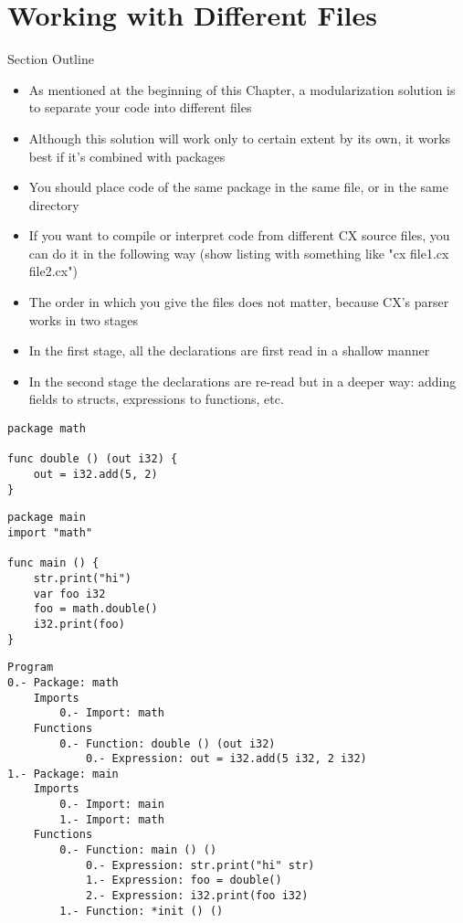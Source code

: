 \documentclass[11pt,fleqn,openany]{book} %
\begin{document}
\section{Working with Different Files}

\begin{remark}
Section Outline
    \begin{itemize}
    	\item As mentioned at the beginning of this Chapter, a modularization solution is to separate your code into different files
        \item Although this solution will work only to certain extent by its own, it works best if it's combined with packages
        \item You should place code of the same package in the same file, or in the same directory
        \item If you want to compile or interpret code from different CX source files, you can do it in the following way (show listing with something like "cx file1.cx file2.cx")
        \item The order in which you give the files does not matter, because CX's parser works in two stages
        \item In the first stage, all the declarations are first read in a shallow manner
        \item In the second stage the declarations are re-read but in a deeper way: adding fields to structs, expressions to functions, etc.
    \end{itemize}
\end{remark}

\begin{lstlisting}[caption={Package to be Imported},captionpos=b,label={listing:import-example}]
package math

func double () (out i32) {
	out = i32.add(5, 2)
}
\end{lstlisting}

\begin{lstlisting}[caption={Main Package},captionpos=b,label={listing:main-package-example}]
package main
import "math"

func main () {
	str.print("hi")
	var foo i32
	foo = math.double()
	i32.print(foo)
}
\end{lstlisting}

\begin{lstlisting}[caption={Resulting Abstract Syntax Tree},captionpos=b,label={listing:resulting-ast}]
Program
0.- Package: math
	Imports
		0.- Import: math
	Functions
		0.- Function: double () (out i32)
			0.- Expression: out = i32.add(5 i32, 2 i32)
1.- Package: main
	Imports
		0.- Import: main
		1.- Import: math
	Functions
		0.- Function: main () ()
			0.- Expression: str.print("hi" str)
			1.- Expression: foo = double()
			2.- Expression: i32.print(foo i32)
		1.- Function: *init () ()
\end{lstlisting}
\end{document}
